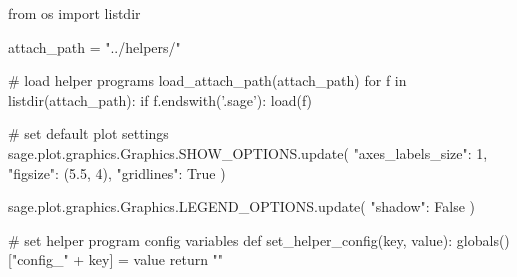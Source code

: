 \begin{sagesilent}
    from os import listdir

    attach_path = "../helpers/"

    # load helper programs
    load_attach_path(attach_path)
    for f in listdir(attach_path):
        if f.endswith('.sage'): load(f)

    # set default plot settings
    sage.plot.graphics.Graphics.SHOW_OPTIONS.update({
        "axes_labels_size": 1,
        "figsize": (5.5, 4),
        "gridlines": True
    })

    sage.plot.graphics.Graphics.LEGEND_OPTIONS.update({
        "shadow": False
    })

    # set helper program config variables
    def set_helper_config(key, value):
        globals()["config_" + key] = value
        return ""
\end{sagesilent}

\loadsciconfig